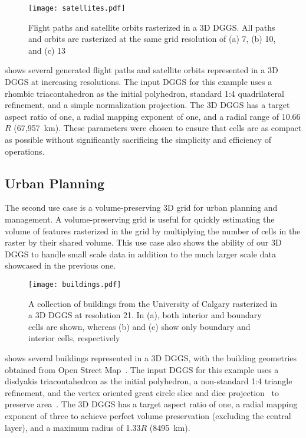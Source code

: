 \begin{figure}[ht!]
	\centering
	\texttt{[image: satellites.pdf]}
	\caption[Flight path and satellite orbit use case showing several sample trajectories]{
		Flight paths and satellite orbits rasterized in a 3D DGGS.
		All paths and orbits are rasterized at the same grid resolution of (a) 7, (b) 10, and (c) 13
	}
	\label{fig:satellites}
\end{figure}


 shows several generated flight paths and satellite orbits represented in a 3D DGGS at increasing resolutions.
The input DGGS for this example uses a rhombic triacontahedron as the initial polyhedron, standard 1:4 quadrilateral refinement, and a simple normalization projection.
The 3D DGGS has a target aspect ratio of one, a radial mapping exponent of one, and a radial range of 10.66$R$ (67,957~km).
These parameters were chosen to ensure that cells are as compact as possible without significantly sacrificing the simplicity and efficiency of operations.

\subsection{Urban Planning}
The second use case is a volume-preserving 3D grid for urban planning and management.
A volume-preserving grid is useful for quickly estimating the volume of features rasterized in the grid by multiplying the number of cells in the raster by their shared volume.
This use case also shows the ability of our 3D DGGS to handle small scale data in addition to the much larger scale data showcased in the previous one.


\begin{figure}[ht!]
	\centering
	\texttt{[image: buildings.pdf]}
	\caption[Urban planning use case showing various rasterized buildings]{
		A collection of buildings from the University of Calgary rasterized in a 3D DGGS at resolution 21.
		In (a), both interior and boundary cells are shown, whereas (b) and (c) show only boundary and interior cells, respectively
	}
	\label{fig:urbanplanning}
\end{figure}


 shows several buildings represented in a 3D DGGS, with the building geometries obtained from Open Street Map~\cite{osm}.
The input DGGS for this example uses a disdyakis triacontahedron as the initial polyhedron, a non-standard 1:4 triangle refinement, and the vertex oriented great circle slice and dice projection~\cite{van2006slice} to preserve area~\cite{hall2020disdyakis}.
The 3D DGGS has a target aspect ratio of one, a radial mapping exponent of three to achieve perfect volume preservation (excluding the central layer), and a maximum radius of 1.33$R$ (8495~km).


